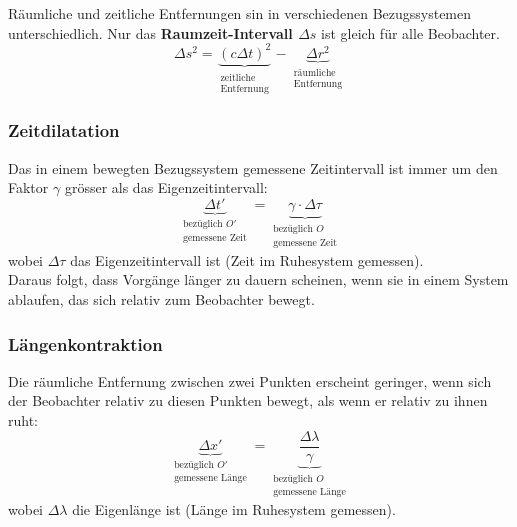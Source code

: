 \documentclass[7pt]{article}
\begin{document}
\begin{multicols*}{3}
R{\"a}umliche und zeitliche Entfernungen sin in verschiedenen Bezugssystemen unterschiedlich. Nur das \textbf{Raumzeit-Intervall $\Delta s$} ist gleich f{\"u}r alle Beobachter.
\begin{equation*}
	\Delta s^2 = \underbrace{(c\Delta t)^2}_{\substack{\text{zeitliche}\\ \text{Entfernung}}} - \underbrace{\Delta r^2}_{\substack{\text{r{\"a}umliche}\\ \text{Entfernung}}}
\end{equation*}

\subsubsection{Zeitdilatation}

Das in einem bewegten Bezugssystem gemessene Zeitintervall ist immer um den Faktor $\gamma$ gr{\"o}sser als das Eigenzeitintervall:
\begin{equation*}
	\underbrace{\Delta t'}_{\substack{\text{bez{\"u}glich $O'$}\\ \text{gemessene Zeit}}}  =  \underbrace{\gamma \cdot \Delta\tau}_{\substack{\text{bez{\"u}glich $O$}\\ \text{gemessene Zeit}}}
\end{equation*}
wobei $\Delta\tau$ das Eigenzeitintervall ist (Zeit im Ruhesystem gemessen). \\

Daraus folgt, dass Vorg{\"a}nge l{\"a}nger zu dauern scheinen, wenn sie in einem System ablaufen, das sich relativ zum Beobachter bewegt.

\subsubsection{L{\"a}ngenkontraktion}

Die r{\"a}umliche Entfernung zwischen zwei Punkten erscheint geringer, wenn sich der Beobachter relativ zu diesen Punkten bewegt, als wenn er relativ zu ihnen ruht:
\begin{equation*}
	\underbrace{\Delta x'}_{\substack{\text{bez{\"u}glich $O'$}\\ \text{gemessene L{\"a}nge}}}  =  \underbrace{\frac{\Delta\lambda}{\gamma}}_{\substack{\text{bez{\"u}glich $O$}\\ \text{gemessene L{\"a}nge}}}
\end{equation*}
wobei $\Delta\lambda$ die Eigenl{\"a}nge ist (L{\"a}nge im Ruhesystem gemessen).

\end{multicols*}
\end{document}
